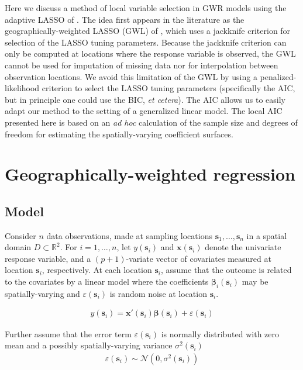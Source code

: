 \documentclass[authoryear, review, 11pt]{elsarticle}
\begin{document}
	Here we discuss a method of local variable selection in GWR models using the adaptive LASSO of \cite{Zou:2006}. The idea first appears in the literature as the geographically-weighted LASSO (GWL) of \cite{Wheeler:2009}, which uses a jackknife criterion for selection of the LASSO tuning parameters. Because the jackknife criterion can only be computed at locations where the response variable is observed, the GWL cannot be used for imputation of missing data nor for interpolation between observation locations. We avoid this limitation of the GWL by using a penalized-likelihood criterion to select the LASSO tuning parameters (specifically the AIC, but in principle one could use the BIC, \emph{et cetera}). The AIC allows us to easily adapt our method to the setting of a generalized linear model. The local AIC presented here is based on an \emph{ad hoc} calculation of the sample size and degrees of freedom for estimating the spatially-varying coefficient surfaces.
	
\section{Geographically-weighted regression \label{section:GWR}}

	\subsection{Model}
	Consider $n$ data observations, made at sampling locations $\bm{s}_1, \dots, \bm{s}_n$ in a spatial domain $D \subset \mathbb{R}^2$. For $i = 1, \dots, n$, let $y(\bm{s}_i)$ and $\bm{x}(\bm{s}_i)$ denote the univariate response variable, and a $(p+1)$-variate vector of covariates measured at location $\bm{s}_i$, respectively. At each location $\bm{s}_i$, assume that the outcome is related to the covariates by a linear model where the coefficients $\bm{\beta}_i(\bm{s}_i)$ may be spatially-varying and $\varepsilon(\bm{s}_i)$ is random noise at location $\bm{s}_i$.

	\begin{eqnarray}
		y(\bm{s}_i) = \bm{x}'(\bm{s}_i) \bm{\beta}(\bm{s}_i) + \varepsilon(\bm{s}_i)
	\label{eq:lm(s)}
	\end{eqnarray}
	
	Further assume that the error term $\varepsilon(\bm{s}_i)$ is normally distributed with zero mean and a possibly spatially-varying variance $\sigma^2(\bm{s}_i)$
	\begin{eqnarray}
		\varepsilon(\bm{s}_i) \sim \mathcal{N} \left( 0,\sigma^2(\bm{s}_i) \right)
	\label{eq:err}
	\end{eqnarray}
	
\end{document}
